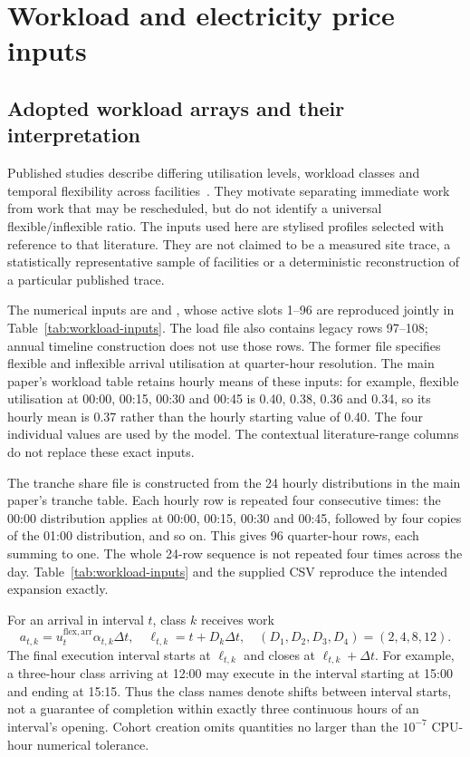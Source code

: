\section{Workload and \textcolor{LatestGreen}{electricity price} inputs}
\subsection{Adopted workload arrays and their interpretation}
Published studies describe differing utilisation levels, workload classes and temporal flexibility across facilities~\cite{Cao2022ApEn,6779441,Misaghian2023TIA,Liu2012PER}. They motivate separating immediate work from work that may be rescheduled, but do not identify a universal flexible/inflexible ratio. The inputs used here are stylised profiles selected with reference to that literature. They are not claimed to be a measured site trace, a statistically representative sample of facilities or a deterministic reconstruction of a particular published trace.

The numerical inputs are  and , whose active slots 1--96 are reproduced jointly in Table~\ref{tab:workload-inputs}. The load file also contains legacy rows 97--108; annual timeline construction does not use those rows. The former file specifies flexible and inflexible arrival utilisation at quarter-hour resolution. The main paper's workload table retains hourly means of these inputs: for example, flexible utilisation at 00:00, 00:15, 00:30 and 00:45 is 0.40, 0.38, 0.36 and 0.34, so its hourly mean is 0.37 rather than the hourly starting value of 0.40. The four individual values are used by the model. The contextual literature-range columns do not replace these exact inputs.

The \textcolor{LatestGreen}{tranche share} file is constructed from the 24 hourly distributions in the main paper's tranche table. Each hourly row is repeated four consecutive times: the 00:00 distribution applies at 00:00, 00:15, 00:30 and 00:45, followed by four copies of the 01:00 distribution, and so on. This gives 96 quarter-hour rows, each summing to one. The whole 24-row sequence is not repeated four times across the day. Table~\ref{tab:workload-inputs} and the supplied CSV reproduce the intended expansion exactly.

For an arrival in interval $t$, class $k$ receives work
\begin{equation}
a_{t,k}=u_t^{\mathrm{flex,arr}}\alpha_{t,k}\Delta t,
\quad \ell_{t,k}=t+D_k\Delta t,
\quad (D_1,D_2,D_3,D_4)=(2,4,8,12).
\end{equation}
The final execution interval starts at $\ell_{t,k}$ and closes at $\ell_{t,k}+\Delta t$. For example, a three-hour class arriving at 12:00 may execute in the interval starting at 15:00 and ending at 15:15. Thus the class names denote shifts between interval starts, not a guarantee of completion within exactly three continuous hours of an interval's opening. Cohort creation omits quantities no larger than the $10^{-7}$ CPU-hour numerical tolerance.

